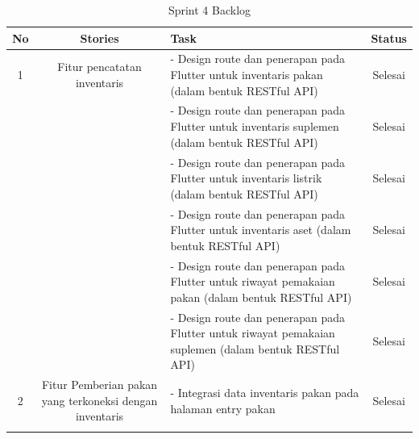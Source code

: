 \begin{spacing}{1.5}
	\begin{table}[H]	
		\begin{center}
			\caption{Sprint 4 Backlog}
			\label{tab:table21}
			\begin{tabular}{|c|c|m{13em}|c|}
			\hline
			\textbf{No} & \textbf{Stories} & \textbf{Task} & \textbf{Status} \\
			\hline
			1 & \multirow{1}{12em}{Fitur pencatatan inventaris} & - Design route dan penerapan pada Flutter untuk inventaris pakan (dalam bentuk RESTful API) & Selesai \\
			\hline
			&  & - Design route dan penerapan pada Flutter untuk inventaris suplemen (dalam bentuk RESTful API) & Selesai  \\ 
			\hline
			&  & - Design route dan penerapan pada Flutter untuk inventaris listrik (dalam bentuk RESTful API) & Selesai  \\ 
			\hline
			&  & - Design route dan penerapan pada Flutter untuk inventaris aset (dalam bentuk RESTful API) & Selesai  \\ 
			\hline
			&  & - Design route dan penerapan pada Flutter untuk riwayat pemakaian pakan (dalam bentuk RESTful API) & Selesai  \\ 
			\hline
			&  & - Design route dan penerapan pada Flutter untuk riwayat pemakaian suplemen (dalam bentuk RESTful API) & Selesai  \\ 
			\hline
			2 & \multirow{1}{12em}{Fitur Pemberian pakan yang terkoneksi dengan inventaris} & - Integrasi data inventaris pakan pada halaman entry pakan  & Selesai \\
			&  &  &  \\ 
			\hline
			\end{tabular}
		\end{center}
	\end{table}




\end{spacing}
